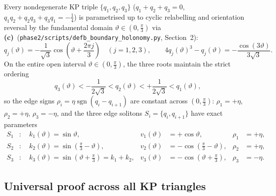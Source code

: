 \documentclass[11pt,a4paper]{article}
\theoremstyle{remark}
\newcommand{\sgn}{\operatorname{sgn}}
\newcommand{\Lc}{\textbf{(c)}}
\newcommand{\shol}{\texttt{phase2/\allowbreak scripts/\allowbreak defb\_\allowbreak boundary\_\allowbreak holonomy.py}}
\begin{document}
Every nondegenerate KP triple $\{q_1,q_2,q_3\}$ ($q_1+q_2+q_3=0$,
$q_1 q_2 + q_2 q_3 + q_3 q_1 = -\frac{1}{4}$) is parametrised up to cyclic
relabelling and orientation reversal by the fundamental domain
$\vartheta \in (0,\frac{\pi}{3})$ via \Lc\ (\shol, Section~2):
\begin{equation}\label{eq:qj_theta}
  q_j(\vartheta) = -\frac{1}{\sqrt{3}}\cos\!\left(\vartheta + \frac{2\pi j}{3}\right) \quad (j=1,2,3), \qquad
  4q_j(\vartheta)^3 - q_j(\vartheta) = -\frac{\cos(3\vartheta)}{3\sqrt{3}}.
\end{equation}
On the entire open interval $\vartheta \in (0,\frac{\pi}{3})$, the three roots
maintain the strict ordering
\begin{equation}\label{eq:qj_order}
  q_3(\vartheta) < -\frac{1}{2\sqrt{3}} < q_2(\vartheta) < +\frac{1}{2\sqrt{3}} < q_1(\vartheta),
\end{equation}
so the edge signs $\rho_i = \eta\sgn(q_i - q_{i+1})$ are constant across
$(0,\frac{\pi}{3})$: $\rho_1 = +\eta$, $\rho_2 = +\eta$, $\rho_3 = -\eta$, and
the three edge solitons $S_i = \{q_i,q_{i+1}\}$ have exact parameters
\begin{equation}\label{eq:edge_params}
  \begin{aligned}
  S_1 &: \quad k_1(\vartheta) = \sin\vartheta, & v_1(\vartheta) &= +\cos\vartheta, & \rho_1 &= +\eta,\\
  S_2 &: \quad k_2(\vartheta) = \sin\!\left(\frac{\pi}{3}-\vartheta\right), & v_2(\vartheta) &= -\cos\!\left(\frac{\pi}{3}-\vartheta\right), & \rho_2 &= +\eta,\\
  S_3 &: \quad k_3(\vartheta) = \sin\!\left(\vartheta+\frac{\pi}{3}\right) = k_1 + k_2, & v_3(\vartheta) &= -\cos\!\left(\vartheta+\frac{\pi}{3}\right), & \rho_3 &= -\eta.
  \end{aligned}
\end{equation}

\subsection{Universal proof across all KP triangles}
\end{document}
